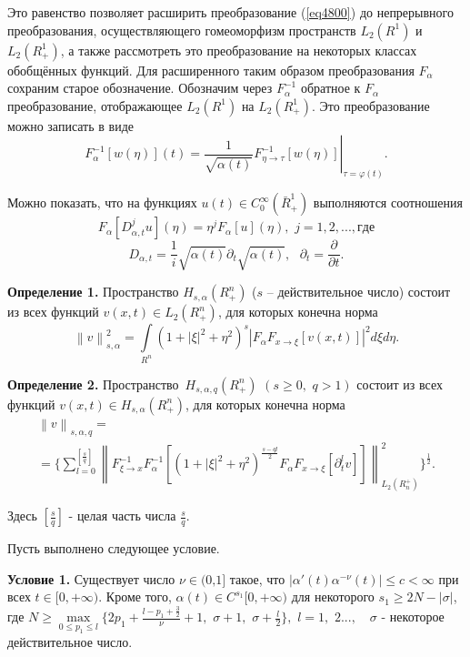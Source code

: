 Это равенство позволяет расширить преобразование (\ref{eq4800}) до непрерывного
преобразования, осуществляющего гомеоморфизм пространств $L_{2} (R^1)$
и $L_{2} (R_ + ^1 )$, а также рассмотреть это преобразование на
некоторых классах обобщённых функций. Для расширенного таким образом
преобразования $F_\alpha $ сохраним старое обозначение. Обозначим через
$F_\alpha ^{ - 1} $ обратное к $F_\alpha $ преобразование, отображающее
$L_{2} (R^1)$ на $L_{2} (R_ + ^1 )$. Это преобразование можно
записать в виде
\[
F_\alpha ^{ - 1} [w(\eta )](t) = \left. {\frac{1}{\sqrt {\alpha (t)}
}F_{\eta \to \tau }^{ - 1} [w(\eta )]} \right|_{\tau = \varphi (t)} .
\]



Можно показать, что на функциях $u(t) \in C_0^\infty (\bar {R}_ + ^1 )$
выполняются соотношения
\[
F_\alpha [D_{\alpha ,t}^j u](\eta ) = \eta ^jF_\alpha [u](\eta ),\,\,j =
1,2,...,\mbox{г}\mbox{д}\mbox{е}
\]\[
D_{\alpha ,t} = \frac{1}{i}\sqrt {\alpha (t)} \partial _t \sqrt {\alpha (t)}
,\,\,\,\,\partial _t = \frac{\partial }{\partial t}.
\]



\textbf{Определение 1.} Пространство $H_{s,\alpha } (R_ + ^n )$ ($s$ --
действительное число) состоит из всех функций $v(x,t) \in L_2 (R_ + ^n )$,
для которых конечна норма
\[
\left\| v \right\|_{s,\alpha }^2 = \int\limits_{R^n} {(1 + \left| \xi
\right|^2 + \eta ^2)^s\left| {F_\alpha F_{x \to \xi } [v(x,t)]}
\right|^2d\xi d\eta } .
\]



\textbf{Определение 2.} Пространство $\,H_{s,\alpha ,q} (R_ + ^n )\,\,(s
\geqslant 0,\,\,q > 1)$ состоит из всех функций $v(x,t) \in H_{s,\alpha } (R_ + ^n
)$, для которых конечна норма
\begin{multline*}
\left\| v \right\|_{s,\alpha ,q} =
\\=
\{\sum\limits_{l = 0}^{[\frac{s}{q}]}
{\left\| {F_{\xi \to x}^{ - 1} F_\alpha ^{ - 1} [(1 + \left| \xi \right|^2 +
\eta ^2)^{\frac{s - ql}{2}}F_\alpha F_{x \to \xi } [\partial _t^l v]]}
\right\|_{L_2 (R_n^ + )}^2 } \}^{\frac{1}{2}}.
\end{multline*}



Здесь $[\frac{s}{q}]$ - целая часть числа $\frac{s}{q}.$



Пусть выполнено следующее условие.

\textbf{Условие 1.} Существует число $\nu \in \mbox{(0,1]}$ такое, что
$\left| {\alpha '(t)\alpha ^{ - \nu }(t)} \right| \leqslant c < \infty $ при всех
$t \in [0, + \infty )$. Кроме того, $\alpha (t) \in C^{s_1 }[0, + \infty )$
для некоторого $s_1 \geqslant 2N - \left| \sigma \right|$, где $N \geqslant \mathop
{\max }\limits_{0 \leqslant p_1 \leqslant l} \{2p_1 + \frac{l - p_1 + \frac{3}{2}}{\nu }
+ 1,\,\,\sigma + 1,\,\,\sigma + \frac{l}{2}\},\,\,l = 1,\,\,2..., \quad \sigma $
- некоторое действительное число.

